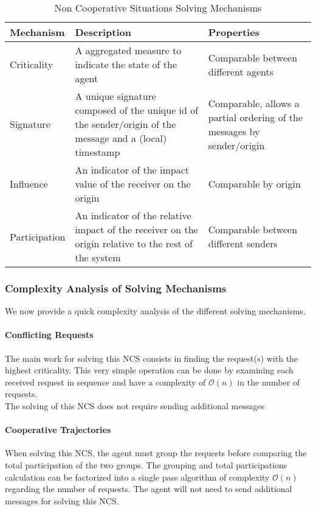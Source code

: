 \begin{table}
\caption{Non Cooperative Situations Solving Mechanisms}\label{NCS_mechanisms_summary}
\centering
\begin{tabular}{lp{6cm}p{5.5cm}}
	\toprule
	Mechanism & Description & Properties\\
	\midrule
	Criticality & A aggregated measure to indicate the state of the agent & Comparable between different agents\\
	Signature & A unique signature composed of the unique id of the sender/origin of the message and a (local) timestamp & Comparable, allows a partial ordering of the messages by sender/origin\\
	Influence & An indicator of the impact value of the receiver on the origin & Comparable by origin\\
	 Participation & An indicator of the relative impact of the receiver on the origin relative to the rest of the system & Comparable between different senders\\
	\bottomrule
\end{tabular}
\end{table}

\subsubsection*{Complexity Analysis of Solving Mechanisms}

We now provide a quick complexity analysis of the different solving mechanisms.

\paragraph*{Conflicting Requests}

The main work for solving this NCS consists in finding the request(s) with the highest criticality. This very simple operation can be done by examining each received request in sequence and have a complexity of $\mathcal{O}(n)$ in the number of requests.\\
The solving of this NCS does not require sending additional messages

\paragraph*{Cooperative Trajectories }

When solving this NCS, the agent must group the requests before comparing the total participation of the two groups. The grouping and total participations calculation can be factorized into a single pass algorithm of complexity $\mathcal{O}(n)$ regarding the number of requests.
The agent will not need to send additional messages for solving this NCS.

